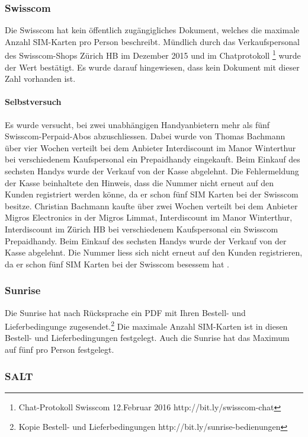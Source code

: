 \subsubsection{Swisscom}\label{swisscom}

Die Swisscom hat kein öffentlich zugängigliches Dokument, welches die
maximale Anzahl SIM-Karten pro Person beschreibt. Mündlich durch das
Verkaufspersonal des Swisscom-Shops Zürich HB im Dezember 2015 und im
Chatprotokoll \footnote{Chat-Protokoll Swisscom 12.Februar 2016
  http://bit.ly/swisscom-chat} wurde der Wert bestätigt. Es wurde darauf
hingewiesen, dass kein Dokument mit dieser Zahl vorhanden ist.

\paragraph{Selbstversuch}\label{selbstversuch}

Es wurde versucht, bei zwei unabhängigen Handyanbietern mehr als fünf
Swisscom-Perpaid-Abos abzuschliessen. Dabei wurde von Thomas Bachmann
über vier Wochen verteilt bei dem Anbieter Interdiscount im Manor
Winterthur bei verschiedenem Kaufspersonal ein Prepaidhandy eingekauft.
Beim Einkauf des sechsten Handys wurde der Verkauf von der Kasse
abgelehnt. Die Fehlermeldung der Kasse beinhaltete den Hinweis, dass die
Nummer nicht erneut auf den Kunden registriert werden könne, da er schon
fünf SIM Karten bei der Swisscom besitze. Christian Bachmann kaufte über
zwei Wochen verteilt bei dem Anbieter Migros Electronics in der Migros
Limmat, Interdiscount im Manor Winterthur, Interdiscount im Zürich HB
bei verschiedenem Kaufspersonal ein Swisscom Prepaidhandy. Beim Einkauf
des sechsten Handys wurde der Verkauf von der Kasse abgelehnt. Die
Nummer liess sich nicht erneut auf den Kunden registrieren, da er schon
fünf SIM Karten bei der Swisscom besessem hat .

\subsubsection{Sunrise}\label{sunrise}

Die Sunrise hat nach Rücksprache ein PDF mit Ihren Bestell- und
Lieferbedingunge zugesendet.\footnote{Kopie Bestell- und
  Lieferbedingungen http://bit.ly/sunrise-bedienungen} Die maximale
Anzahl SIM-Karten ist in diesen Bestell- und Lieferbedingungen
festgelegt. Auch die Sunrise hat das Maximum auf fünf pro Person
festgelegt.

\subsubsection{SALT}\label{salt}

